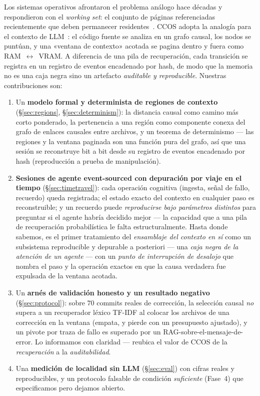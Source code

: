 \documentclass[11pt]{article}
\begin{document}
Los sistemas operativos afrontaron el problema análogo hace décadas y respondieron
con el \emph{working set}: el conjunto de páginas referenciadas recientemente que
deben permanecer residentes~\cite{denning1968working}. CCOS adopta la analogía para
el contexto de LLM~\cite{packer2023memgpt}: el código fuente se analiza en un grafo
causal, los nodos se puntúan, y una «ventana de contexto» acotada se pagina dentro y
fuera como RAM~$\leftrightarrow$~VRAM. A diferencia de una pila de recuperación, cada
transición se registra en un registro de eventos encadenado por hash, de modo que la
memoria no es una caja negra sino un artefacto \emph{auditable y reproducible}.
Nuestras contribuciones son:

\begin{enumerate}
  \item Un \textbf{modelo formal y determinista de regiones de contexto}
  (\S\ref{sec:regions}, \S\ref{sec:determinism}): la distancia causal como camino más
  corto ponderado, la pertenencia a una región como componente conexa del grafo de
  enlaces causales entre archivos, y un teorema de determinismo --- las regiones y la
  ventana paginada son una función pura del grafo, así que una sesión se reconstruye
  bit a bit desde su registro de eventos encadenado por hash (reproducción a prueba de
  manipulación).
  \item \textbf{Sesiones de agente event-sourced con depuración por viaje en el
  tiempo} (\S\ref{sec:timetravel}): cada operación cognitiva (ingesta, señal de fallo,
  recuerdo) queda registrada; el estado exacto del contexto en cualquier paso es
  reconstruible; y un recuerdo puede \emph{reproducirse bajo parámetros distintos}
  para preguntar si el agente habría decidido mejor --- la capacidad que a una pila de
  recuperación probabilística le falta estructuralmente. Hasta donde sabemos, es el
  primer tratamiento del \emph{ensamblaje del contexto en sí} como un subsistema
  reproducible y depurable a posteriori --- una \emph{caja negra de la atención de un
  agente} --- con un \emph{punto de interrupción de desalojo} que nombra el paso y la
  operación exactos en que la causa verdadera fue expulsada de la ventana acotada.
  \item Un \textbf{arnés de validación honesto y un resultado negativo}
  (\S\ref{sec:protocol}): sobre $70$ commits reales de corrección, la selección causal
  \emph{no} supera a un recuperador léxico TF-IDF al colocar los archivos de una
  corrección en la ventana (empata, y pierde con un presupuesto ajustado), y un pivote
  por traza de fallo es superado por un RAG-sobre-el-mensaje-de-error. Lo informamos
  con claridad --- reubica el valor de CCOS de la \emph{recuperación} a la
  \emph{auditabilidad}.
  \item Una \textbf{medición de localidad sin LLM} (\S\ref{sec:eval}) con cifras
  reales y reproducibles, y un protocolo falsable de condición \emph{suficiente}
  (Fase~4) que especificamos pero dejamos abierto.
\end{enumerate}
\end{document}
